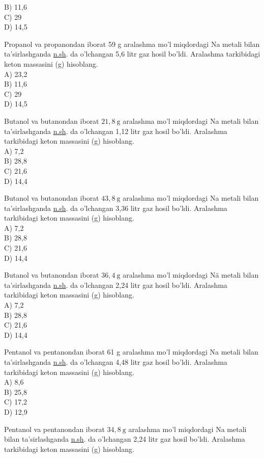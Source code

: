 B) 11,6\\
C) 29\\
D) 14,5
  \item Propanol va propanondan iborat 59 g aralashma mo'l miqdordagi Na metali bilan ta'sirlashganda \href{http://n.sh}{n.sh}. da o'lchangan 5,6 litr gaz hosil bo'ldi. Aralashma tarkibidagi keton massasini (g) hisoblang.\\
A) 23,2\\
B) 11,6\\
C) 29\\
D) 14,5
  \item Butanol va butanondan iborat $21,8 \mathrm{~g}$ aralashma mo'l miqdordagi Na metali bilan ta'sirlashganda \href{http://n.sh}{n.sh}. da o'lchangan 1,12 litr gaz hosil bo'ldi. Aralashma tarkibidagi keton massasini (g) hisoblang.\\
A) 7,2\\
B) 28,8\\
C) 21,6\\
D) 14,4
  \item Butanol va butanondan iborat $43,8 \mathrm{~g}$ aralashma mo'l miqdordagi Na metali bilan ta'sirlashganda \href{http://n.sh}{n.sh}. da o'lchangan 3,36 litr gaz hosil bo'ldi. Aralashma tarkibidagi keton massasini (g) hisoblang.\\
A) 7,2\\
B) 28,8\\
C) 21,6\\
D) 14,4
  \item Butanol va butanondan iborat $36,4 \mathrm{~g}$ aralashma mo'l miqdordagi Nä metali bilan ta'sirlashganda \href{http://n.sh}{n.sh}. da o'lchangan 2,24 litr gaz hosil bo'ldi. Aralashma tarkibidagi keton massasini (g) hisoblang.\\
A) 7,2\\
B) 28,8\\
C) 21,6\\
D) 14,4
  \item Pentanol va pentanondan iborat 61 g aralashma mo'l miqdordagi Na metali bilan ta'sirlashganda \href{http://n.sh}{n.sh}. da o'lchangan 4,48 litr gaz hosil bo'ldi. Aralashma tarkibidagi keton massasini (g) hisoblang.\\
A) 8,6\\
B) 25,8\\
C) 17,2\\
D) 12,9
  \item Pentanol va pentanondan iborat $34,8 \mathrm{~g}$ aralashma mo'l miqdordagi Na metali bilan ta'sirlashganda \href{http://n.sh}{n.sh}. da o'lchangan 2,24 litr gaz hosil bo'ldi. Aralashma tarkibidagi keton massasini (g) hisoblang.\\
